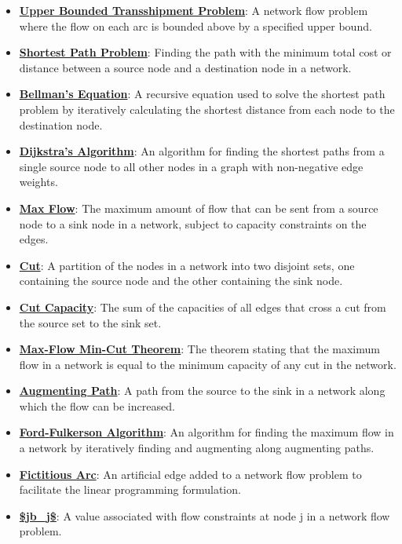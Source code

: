 \documentclass{article}%
\begin{document}
\begin{itemize}[leftmargin=*]
\item \href{https://www.math.purdue.edu/~yipn/421/2024-11-14-NetAppls.pdf#page=9}{\textbf{Upper Bounded Transshipment Problem}}: A network flow problem where the flow on each arc is bounded above by a specified upper bound.%
\item \href{https://www.math.purdue.edu/~yipn/421/2024-11-14-NetAppls.pdf#page=13}{\textbf{Shortest Path Problem}}: Finding the path with the minimum total cost or distance between a source node and a destination node in a network.%
\item \href{https://www.math.purdue.edu/~yipn/421/2024-11-14-NetAppls.pdf#page=16}{\textbf{Bellman's Equation}}: A recursive equation used to solve the shortest path problem by iteratively calculating the shortest distance from each node to the destination node.%
\item \href{https://www.math.purdue.edu/~yipn/421/2024-11-14-NetAppls.pdf#page=20}{\textbf{Dijkstra's Algorithm}}: An algorithm for finding the shortest paths from a single source node to all other nodes in a graph with non-negative edge weights.%
\item \href{https://www.math.purdue.edu/~yipn/421/2024-11-19-MaxFlowMinCut.pdf#page=1}{\textbf{Max Flow}}: The maximum amount of flow that can be sent from a source node to a sink node in a network, subject to capacity constraints on the edges.%
\item \href{https://www.math.purdue.edu/~yipn/421/2024-11-19-MaxFlowMinCut.pdf#page=2}{\textbf{Cut}}: A partition of the nodes in a network into two disjoint sets, one containing the source node and the other containing the sink node.%
\item \href{https://www.math.purdue.edu/~yipn/421/2024-11-19-MaxFlowMinCut.pdf#page=2}{\textbf{Cut Capacity}}: The sum of the capacities of all edges that cross a cut from the source set to the sink set.%
\item \href{https://www.math.purdue.edu/~yipn/421/2024-11-19-MaxFlowMinCut.pdf#page=4}{\textbf{Max{-}Flow Min{-}Cut Theorem}}: The theorem stating that the maximum flow in a network is equal to the minimum capacity of any cut in the network.%
\item \href{https://www.math.purdue.edu/~yipn/421/2024-11-19-MaxFlowMinCut.pdf#page=10}{\textbf{Augmenting Path}}: A path from the source to the sink in a network along which the flow can be increased.%
\item \href{https://www.math.purdue.edu/~yipn/421/2024-11-19-MaxFlowMinCut.pdf#page=10}{\textbf{Ford{-}Fulkerson Algorithm}}: An algorithm for finding the maximum flow in a network by iteratively finding and augmenting along augmenting paths.%
\item \href{https://www.math.purdue.edu/~yipn/421/2024-11-19-MaxFlowMinCut.pdf#page=14}{\textbf{Fictitious Arc}}: An artificial edge added to a network flow problem to facilitate the linear programming formulation.%
\item \href{https://www.math.purdue.edu/~yipn/421/2024-11-21-EconNetSimplex.pdf#page=1}{\textbf{\$jb\_j\$}}: A value associated with flow constraints at node j in a network flow problem.%
\end{itemize}
\end{document}
